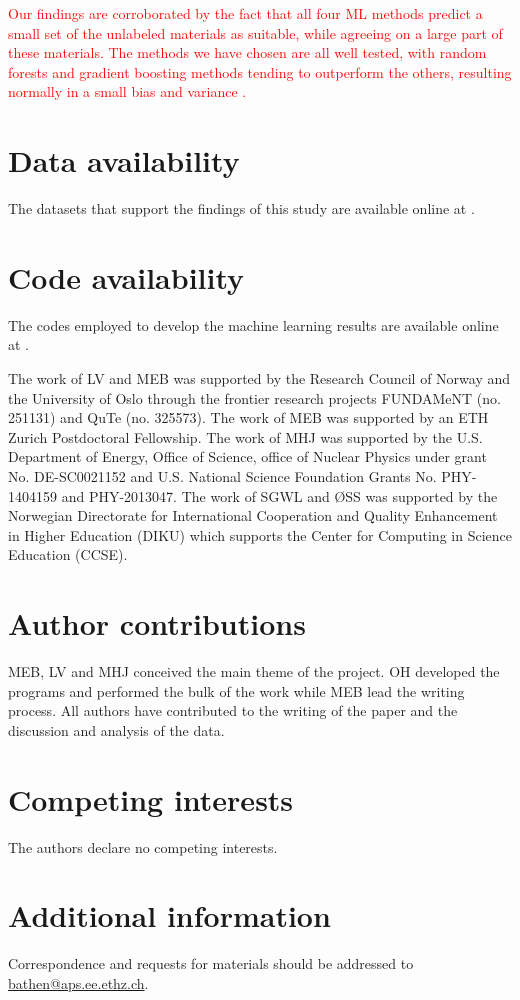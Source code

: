 \documentclass[superscriptaddress,unsortedaddress,
 amsmath,amssymb,
 aps,
]{revtex4-2}
\newcommand{\mrk}[1]{\textcolor{red}{#1}}
\begin{document}
\mrk{Our findings are corroborated by the fact that all four ML methods predict a small set of the unlabeled materials as suitable, while agreeing on a large part of these materials. 
The methods we have chosen are all well tested, with random forests and gradient boosting methods tending to outperform the others, resulting normally in a small bias and variance \cite{Hastie2009,Mehta2019,Murphy2012}.}

\section*{Data availability} 
The datasets that support the findings of this study are available online at \cite{Ohebbi2021}.

\section*{Code availability} 
The codes employed to develop the machine learning results are available online at \cite{Ohebbi2021}. 



\begin{acknowledgments}

The work of LV and MEB was supported by the Research Council of Norway and the University of Oslo through the frontier research projects FUNDAMeNT (no. 251131) and QuTe (no. 325573). 
The work of MEB was supported by an ETH Zurich Postdoctoral Fellowship. 
The work of MHJ was supported by the U.S. Department of Energy, 
Office of Science, office of Nuclear Physics under grant 
No. DE-SC0021152 and U.S. National Science Foundation Grants
No. PHY-1404159 and PHY-2013047. 
The work of SGWL and ØSS was supported by the Norwegian Directorate for International Cooperation and Quality Enhancement in Higher Education (DIKU) which supports the Center for Computing in Science Education (CCSE).


\end{acknowledgments}

\section*{Author contributions}
MEB, LV and MHJ conceived the main theme of the project. OH developed the programs and performed the bulk of the work while MEB lead the writing process. All authors have contributed to the writing of the paper and the discussion and analysis of the data.

\section*{Competing interests}
The authors declare no competing interests.

\section*{Additional information}
Correspondence and requests for materials should be addressed to \url{bathen@aps.ee.ethz.ch}. 
\end{document}
